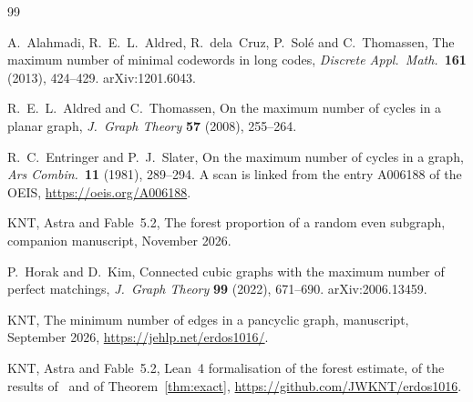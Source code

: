 \documentclass[11pt]{article}
\begin{document}









\begin{thebibliography}{99}\small

 A.~Alahmadi, R.~E.~L.~Aldred, R.~dela~Cruz, P.~Sol\'e and C.~Thomassen, The maximum
number of minimal codewords in long codes, \emph{Discrete Appl.\ Math.}\ \textbf{161} (2013),
424--429. arXiv:1201.6043.

 R.~E.~L.~Aldred and C.~Thomassen, On the maximum number of cycles in a planar graph,
\emph{J.~Graph Theory} \textbf{57} (2008), 255--264.

 R.~C.~Entringer and P.~J.~Slater, On the maximum number of cycles in a graph,
\emph{Ars Combin.}\ \textbf{11} (1981), 289--294. A scan is linked from the entry A006188 of the
OEIS, \url{https://oeis.org/A006188}.

 KNT, Astra and Fable~5.2, The forest proportion of a random even subgraph,
companion manuscript, November 2026.

 P.~Horak and D.~Kim, Connected cubic graphs with the maximum number of perfect
matchings, \emph{J.~Graph Theory} \textbf{99} (2022), 671--690. arXiv:2006.13459.

 KNT, The minimum number of edges in a pancyclic graph, manuscript, September 2026,
\url{https://jehlp.net/erdos1016/}.

 KNT, Astra and Fable~5.2, Lean~4 formalisation of the forest estimate, of the
results of~\cite{KNT} and of Theorem~\ref{thm:exact}, \url{https://github.com/JWKNT/erdos1016}.

\end{thebibliography}
\end{document}
